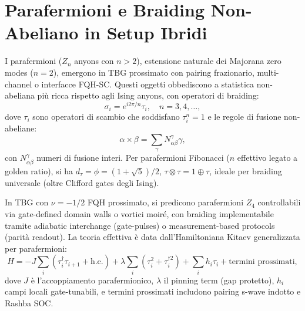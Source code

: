 \documentclass[11pt,a4paper]{article}
\theoremstyle{plain}
\theoremstyle{definition}
\begin{document}
\vspace{0.6cm}





\section{Parafermioni e Braiding Non-Abeliano in Setup Ibridi}

I parafermioni ($Z_n$ anyons con $n > 2$), estensione naturale dei Majorana zero modes ($n=2$), emergono in TBG prossimato con pairing frazionario, multi-channel o interfacce FQH-SC. Questi oggetti obbediscono a statistica non-abeliana più ricca rispetto agli Ising anyons, con operatori di braiding:
\begin{equation}
\sigma_i = e^{i 2\pi / n} \tau_i, \quad n = 3,4,\dots,
\end{equation}
dove $\tau_i$ sono operatori di scambio che soddisfano $\tau_i^n = 1$ e le regole di fusione non-abeliane:
\begin{equation}
\alpha \times \beta = \sum_\gamma N_{\alpha\beta}^\gamma \gamma,
\end{equation}
con $N_{\alpha\beta}^\gamma$ numeri di fusione interi. Per parafermioni Fibonacci ($n$ effettivo legato a golden ratio), si ha $d_\tau = \phi = (1 + \sqrt{5})/2$, $\tau \otimes \tau = 1 \oplus \tau$, ideale per braiding universale (oltre Clifford gates degli Ising).

In TBG con $\nu = -1/2$ FQH prossimato, si predicono parafermioni $Z_4$ controllabili via gate-defined domain walls o vortici moiré, con braiding implementabile tramite adiabatic interchange (gate-pulses) o measurement-based protocols (parità readout). La teoria effettiva è data dall'Hamiltoniana Kitaev generalizzata per parafermioni:
\begin{equation}
H = -J \sum_i (\tau_i^\dagger \tau_{i+1} + \mathrm{h.c.}) + \lambda \sum_i (\tau_i^2 + \tau_i^{\dagger 2}) + \sum_i h_i \tau_i + \text{termini prossimati},
\end{equation}
dove $J$ è l'accoppiamento parafermionico, $\lambda$ il pinning term (gap protetto), $h_i$ campi locali gate-tunabili, e termini prossimati includono pairing s-wave indotto e Rashba SOC.
\end{document}
